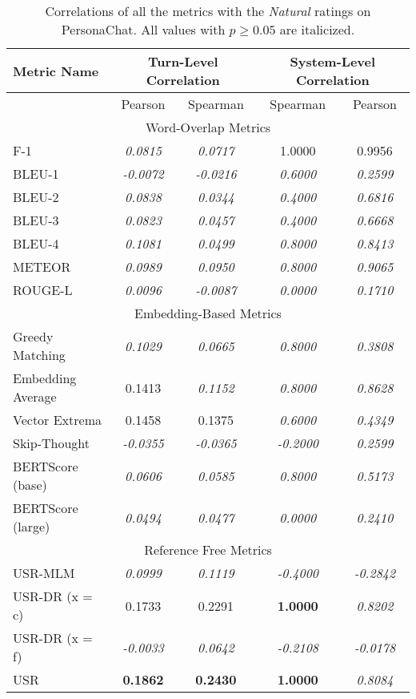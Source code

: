 \documentclass[11pt,a4paper]{article}
\begin{document}
\begin{table*}
    \centering
    \renewcommand*{\arraystretch}{1.2}
    \begin{tabular}{|l|c|c|c|c|}
    \hline
        \textbf{Metric Name} & \multicolumn{2}{|c|}{\textbf{Turn-Level Correlation}} & \multicolumn{2}{|c|}{\textbf{System-Level Correlation}}  \\ \hline
         & Pearson & Spearman & Spearman & Pearson \\ \hline
         \multicolumn{5}{|c|}{Word-Overlap Metrics} \\ \hline
F-1 & \textit{0.0815} & \textit{0.0717} & 1.0000 & 0.9956 \\
BLEU-1 & \textit{-0.0072} & \textit{-0.0216} & \textit{0.6000} & \textit{0.2599} \\
BLEU-2 & \textit{0.0838} & \textit{0.0344} & \textit{0.4000} & \textit{0.6816} \\
BLEU-3 & \textit{0.0823} & \textit{0.0457} & \textit{0.4000} & \textit{0.6668} \\
BLEU-4 & \textit{0.1081} & \textit{0.0499} & \textit{0.8000} & \textit{0.8413} \\
METEOR & \textit{0.0989} & \textit{0.0950} & \textit{0.8000} & \textit{0.9065} \\
ROUGE-L & \textit{0.0096} & \textit{-0.0087} & \textit{0.0000} & \textit{0.1710} \\\hline 
 \multicolumn{5}{|c|}{Embedding-Based Metrics} \\ \hline
Greedy Matching & \textit{0.1029} & \textit{0.0665} & \textit{0.8000} & \textit{0.3808} \\
Embedding Average & 0.1413 & \textit{0.1152} & \textit{0.8000} & \textit{0.8628} \\
Vector Extrema & 0.1458 & 0.1375 & \textit{0.6000} & \textit{0.4349} \\
Skip-Thought & \textit{-0.0355} & \textit{-0.0365} & \textit{-0.2000} & \textit{0.2599} \\
BERTScore (base) & \textit{0.0606} & \textit{0.0585} & \textit{0.8000} & \textit{0.5173} \\
BERTScore (large) & \textit{0.0494} & \textit{0.0477} & \textit{0.0000} & \textit{0.2410} \\\hline 
 \multicolumn{5}{|c|}{Reference Free Metrics} \\ \hline
USR-MLM & \textit{0.0999} & \textit{0.1119} & \textit{-0.4000} & \textit{-0.2842} \\
USR-DR (x = c) & 0.1733 & 0.2291 & \textbf{1.0000} & \textit{0.8202} \\
USR-DR (x = f) & \textit{-0.0033} & \textit{0.0642} & \textit{-0.2108} & \textit{-0.0178} \\
USR & \textbf{0.1862} & \textbf{0.2430} & \textbf{1.0000} & \textit{0.8084} \\ \hline
    \end{tabular}
    \caption{Correlations of all the metrics with the \textit{Natural} ratings on PersonaChat. All values with $p \geq 0.05$ are italicized. }
    
\end{table*}
\end{document}
